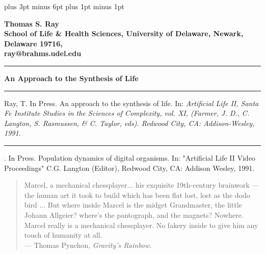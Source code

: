 
\flushbottom
\textheight 9in
\textwidth 6.5in
\textfloatsep 30pt plus 3pt minus 6pt
\parskip 7.5pt plus 1pt minus 1pt
\oddsidemargin 0in
\evensidemargin 0in
\topmargin 0in
\headheight 0in
\headsep 0in

\def\XP{\par\begingroup\parindent 0in\everypar{\hangindent .3in}}
\def\eXP{\par\endgroup}

\def\LP{\par\begingroup\parindent 0in\everypar{\hangindent 0in}}
\def\eLP{\par\endgroup}


\thispagestyle{empty}

\LP
\bf Thomas S. Ray\rm \\
School of Life \& Health Sciences, University of Delaware, Newark, Delaware
19716,\\
ray@brahms.udel.edu\\
\rule[6pt]{6.5in}{1pt}
\Large \bf An Approach to the Synthesis of Life\rm \normalsize\\
\rule[6pt]{6.5in}{2pt}

\XP
Ray, T.  In Press.  An approach to the synthesis of life.
In: \it Artificial Life II\rm , Santa Fe Institute Studies in the Sciences of
Complexity, vol. XI, (Farmer, J. D., C. Langton, S. Rasmussen, \& C. Taylor,
eds).  Redwood City, CA: Addison-Wesley, 1991.

\rule[0pt]{3em}{.4pt}.  In Press.  Population dynamics of digital organisms.
In: "Artificial Life II Video Proceedings" C.G. Langton (Editor),
Redwood City, CA: Addison Wesley, 1991.
\eXP

\vspace{3.5cm}

\begin{quote}
Marcel, a mechanical chessplayer... his exquisite 19th-century brainwork
--- the human art it took to build which has been flat lost, lost as the
dodo bird ...  But where inside Marcel is the midget Grandmaster, the
little Johann Allgeier?  where's the pantograph, and the magnets?  Nowhere.
Marcel really is a mechanical chessplayer.  No fakery inside to give
him any touch of humanity at all.\\
\hspace*{2in}--- Thomas Pynchon, \it Gravity's Rainbow\rm .
\end{quote}

